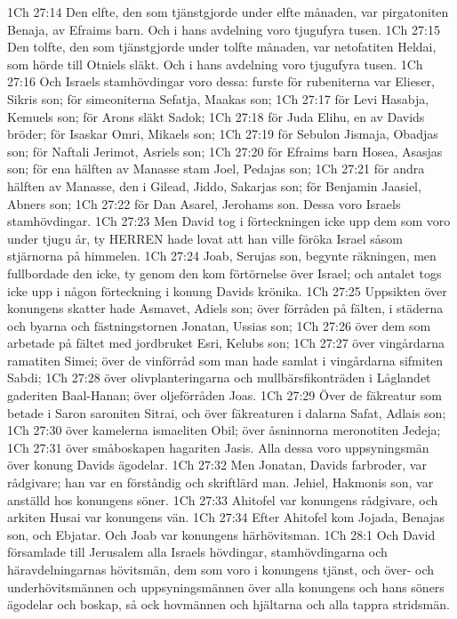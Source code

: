 1Ch 27:14  Den elfte, den som tjänstgjorde under elfte månaden, var pirgatoniten Benaja, av Efraims barn. Och i hans avdelning voro tjugufyra tusen.
1Ch 27:15  Den tolfte, den som tjänstgjorde under tolfte månaden, var netofatiten Heldai, som hörde till Otniels släkt. Och i hans avdelning voro tjugufyra tusen.
1Ch 27:16  Och Israels stamhövdingar voro dessa: furste för rubeniterna var Elieser, Sikris son; för simeoniterna Sefatja, Maakas son;
1Ch 27:17  för Levi Hasabja, Kemuels son; för Arons släkt Sadok;
1Ch 27:18  för Juda Elihu, en av Davids bröder; för Isaskar Omri, Mikaels son;
1Ch 27:19  för Sebulon Jismaja, Obadjas son; för Naftali Jerimot, Asriels son;
1Ch 27:20  för Efraims barn Hosea, Asasjas son; för ena hälften av Manasse stam Joel, Pedajas son;
1Ch 27:21  för andra hälften av Manasse, den i Gilead, Jiddo, Sakarjas son; för Benjamin Jaasiel, Abners son;
1Ch 27:22  för Dan Asarel, Jerohams son. Dessa voro Israels stamhövdingar.
1Ch 27:23  Men David tog i förteckningen icke upp dem som voro under tjugu år, ty HERREN hade lovat att han ville föröka Israel såsom stjärnorna på himmelen.
1Ch 27:24  Joab, Serujas son, begynte räkningen, men fullbordade den icke, ty genom den kom förtörnelse över Israel; och antalet togs icke upp i någon förteckning i konung Davids krönika.
1Ch 27:25  Uppsikten över konungens skatter hade Asmavet, Adiels son; över förråden på fälten, i städerna och byarna och fästningstornen Jonatan, Ussias son;
1Ch 27:26  över dem som arbetade på fältet med jordbruket Esri, Kelubs son;
1Ch 27:27  över vingårdarna ramatiten Simei; över de vinförråd som man hade samlat i vingårdarna sifmiten Sabdi;
1Ch 27:28  över olivplanteringarna och mullbärsfikonträden i Låglandet gaderiten Baal-Hanan; över oljeförråden Joas.
1Ch 27:29  Över de fäkreatur som betade i Saron saroniten Sitrai, och över fäkreaturen i dalarna Safat, Adlais son;
1Ch 27:30  över kamelerna ismaeliten Obil; över åsninnorna meronotiten Jedeja;
1Ch 27:31  över småboskapen hagariten Jasis. Alla dessa voro uppsyningsmän över konung Davids ägodelar.
1Ch 27:32  Men Jonatan, Davids farbroder, var rådgivare; han var en förståndig och skriftlärd man. Jehiel, Hakmonis son, var anställd hos konungens söner.
1Ch 27:33  Ahitofel var konungens rådgivare, och arkiten Husai var konungens vän.
1Ch 27:34  Efter Ahitofel kom Jojada, Benajas son, och Ebjatar. Och Joab var konungens härhövitsman.
1Ch 28:1  Och David församlade till Jerusalem alla Israels hövdingar, stamhövdingarna och häravdelningarnas hövitsmän, dem som voro i konungens tjänst, och över- och underhövitsmännen och uppsyningsmännen över alla konungens och hans söners ägodelar och boskap, så ock hovmännen och hjältarna och alla tappra stridsmän.
